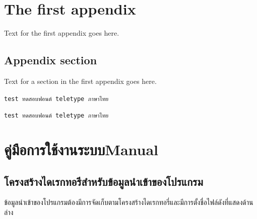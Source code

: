 \chapter{The first appendix}

Text for the first appendix goes here.

\section{Appendix section}

Text for a section in the first appendix goes here.

\verb+test ทดสอบฟอนต์ teletype ภาษาไทย+

\texttt{test ทดสอบฟอนต์ teletype ภาษาไทย}

\chapter{\ifcpe คู่มือการใช้งานระบบ\else Manual\fi}
\section{โครงสร้างไดเรกทอรีสำหรับข้อมูลนำเข้าของโปรแกรม}
\label{apd:snd_apd}
ข้อมูลนำเข้าของโปรแกรมต้องมีการจัดเก็บตามโครงสร้างไดเรกทอรี่และมีการตั้งชื่อไฟล์ดังที่แสดงด้านล่าง

